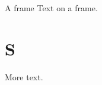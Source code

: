 \documentclass[8pt]{beamer}
\begin{document}
\begin{frame}{A frame}
Text on a frame.
\end{frame}
\section{S}
\begin{frame}
More text.
\end{frame}
\end{document}
